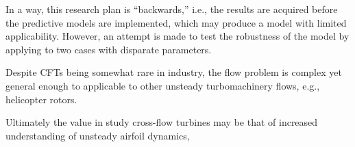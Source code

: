 In a way, this research plan is ``backwards,'' i.e., the results are acquired
before the predictive models are implemented, which may produce a model with
limited applicability. However, an attempt is made to test the robustness of the
model by applying to two cases with disparate parameters.

Despite CFTs being somewhat rare in industry, the flow problem is complex yet
general enough to applicable to other unsteady turbomachinery flows, e.g.,
helicopter rotors.

Ultimately the value in study cross-flow turbines may be that of increased understanding of unsteady airfoil dynamics, 